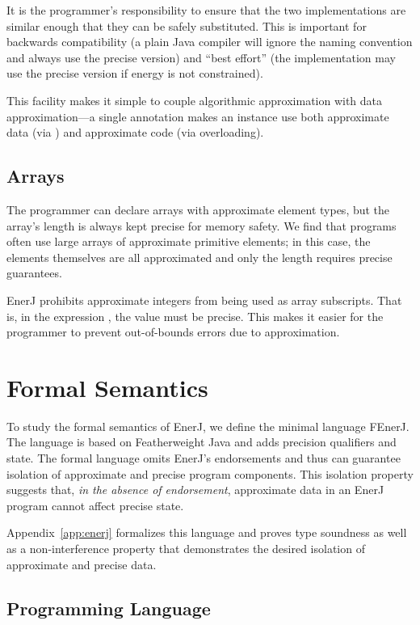 It is the programmer's responsibility to ensure that the two
implementations are similar enough that they can be safely substituted.
This is important for backwards compatibility
(a plain Java compiler will ignore the naming convention and always
use the precise version) and ``best effort'' (the implementation may
use the precise version if energy is not constrained).

This facility makes it simple to couple algorithmic approximation with
data approximation---a single annotation makes an instance use both
approximate data (via ) and approximate code (via
overloading).

\subsection{Arrays}
The programmer can declare arrays with approximate element types, but
the array's length is always kept precise for memory safety.
We find that programs often
use large arrays of approximate primitive elements; in this case, the
elements themselves are all approximated and only the length requires
precise guarantees.

EnerJ prohibits approximate integers from being used as array
subscripts. That is, in the expression , the value  must
be precise. This makes it easier for the programmer to
prevent out-of-bounds errors due to approximation.

\section{Formal Semantics}
\label{enerj:semantics}
To study the formal semantics of EnerJ, we define the minimal language
FEnerJ. The language is based on Featherweight Java \cite{IgarashiEA01}
and adds precision qualifiers and state. The formal language omits
EnerJ's endorsements and thus can guarantee isolation of approximate and
precise program components. This isolation property suggests that,
\emph{in the absence of endorsement}, approximate data in an EnerJ program
cannot affect precise state.

Appendix~\ref{app:enerj} formalizes this language and
proves type soundness as well as a non-interference
property that demonstrates the desired isolation of approximate and
precise data.


\subsection{Programming Language}



